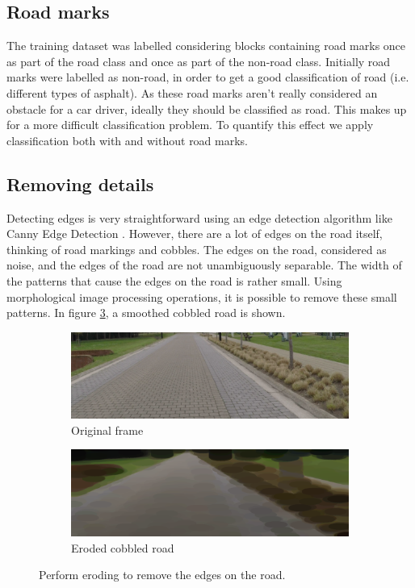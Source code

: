 \documentclass[runningheads,a4paper]{llncs}
\begin{document}
\subsection{Road marks}
The training dataset was labelled considering blocks containing road marks once as part of the road class and once as part of the non-road class. Initially road marks were labelled as non-road, in order to get a good classification of road (i.e. different types of asphalt). As these road marks aren't really considered an obstacle for a car driver, ideally they should be classified as road. This makes up for a more difficult classification problem. To quantify this effect we apply classification both with and without road marks. 

\subsection{Removing details}

Detecting edges is very straightforward using an edge detection algorithm like Canny Edge Detection \cite{canny}. However, there are a lot of edges on the road itself, thinking of road markings and cobbles. The edges on the road, considered as noise, and the edges of the road are not unambiguously separable. The width of the patterns that cause the edges on the road is rather small. Using morphological image processing operations, it is possible to remove these small patterns.  In figure \ref{cobbles_erode_out}, a smoothed cobbled road is shown.
\begin{figure}[ht]
\centering
\begin{subfigure}{.5\textwidth}
  \centering
  \includegraphics[width=.9\textwidth]{fig/cobbles_in.png}
  \caption{Original frame\label{cobbles_in}}
\end{subfigure}%
\begin{subfigure}{.5\textwidth}
  \centering
  \includegraphics[width=.9\textwidth]{fig/cobbles_erode_out.png}
  \caption{Eroded cobbled road\label{cobbles_erode_out}}
\end{subfigure}
\caption{Perform eroding to remove the edges on the road.}
\end{figure}
\end{document}
